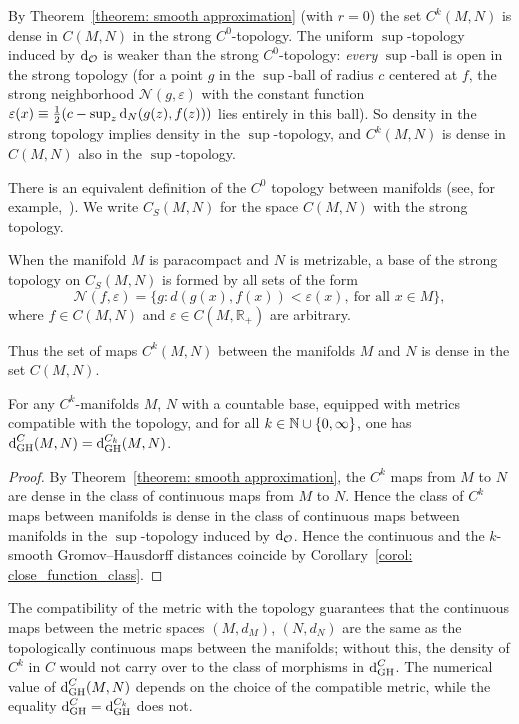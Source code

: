   By Theorem~\ref{theorem: smooth approximation} (with $r=0$) the set $C^k(M,N)$ is dense in $C(M,N)$ in the strong $C^0$-topology. The uniform $\sup$-topology induced by $\operatorname{d}_{\mathcal{O}}$ is weaker than the strong $C^0$-topology: \emph{every} $\sup$-ball is open in the strong topology (for a point $g$ in the $\sup$-ball of radius $c$ centered at $f$, the strong neighborhood $\mathcal{N}(g, \varepsilon)$ with the constant function $\varepsilon(x) \equiv \tfrac12(c - \sup_z \operatorname{d}_{N}(g(z), f(z)))$ lies entirely in this ball). So density in the strong topology implies density in the $\sup$-topology, and $C^k(M,N)$ is dense in $C(M,N)$ also in the $\sup$-topology. \par
  There is an equivalent definition of the $C^0$ topology between manifolds (see, for example,~\cite[p.~59]{hirsch1976differential}). We write $C_S(M,N)$ for the space $C(M,N)$ with the strong topology.
  \begin{define}
    When the manifold $M$ is paracompact and $N$ is metrizable, a base of the strong topology on $C_S(M,N)$ is formed by all sets of the form
    $$
    \mathcal{N}(f,\varepsilon) = \{ g : d(g(x), f(x)) < \varepsilon(x), \ \text{for all } x \in M \},
    $$
    where $f \in C(M,N)$ and $\varepsilon \in C(M, \mathbb{R}_+)$ are arbitrary.
  \end{define}
  Thus the set of maps $C^k(M,N)$ between the manifolds $M$ and $N$ is dense in the set $C(M,N)$.
  \begin{theorem}
    For any $C^k$-manifolds $M$, $N$ with a countable base, equipped with metrics compatible with the topology, and for all $k \in {\mathbb N} \cup \{0, \infty\}$, one has $\operatorname{d}^{C}_{\mathrm{GH}}(M,N) = \operatorname{d}^{C_k}_{\mathrm{GH}}(M,N)$.
  \end{theorem}
  \begin{proof}
    By Theorem~\ref{theorem: smooth approximation}, the $C^k$ maps from $M$ to $N$ are dense in the class of continuous maps from $M$ to $N$.
    Hence the class of $C^k$ maps between manifolds is dense in the class of continuous maps between manifolds in the $\sup$-topology induced by $\operatorname{d}_{\mathcal{O}}$. 
    Hence the continuous and the $k$-smooth Gromov--Hausdorff distances coincide by Corollary~\ref{corol: close_function_class}.
  \end{proof}
  \begin{comm}
    The compatibility of the metric with the topology guarantees that the continuous maps between the metric spaces $(M,d_M)$, $(N,d_N)$ are the same as the topologically continuous maps between the manifolds; without this, the density of $C^k$ in $C$ would not carry over to the class of morphisms in $\operatorname{d}^{C}_{\mathrm{GH}}$. The numerical value of $\operatorname{d}^{C}_{\mathrm{GH}}(M,N)$ depends on the choice of the compatible metric, while the equality $\operatorname{d}^{C}_{\mathrm{GH}} = \operatorname{d}^{C_k}_{\mathrm{GH}}$ does not.
  \end{comm}
